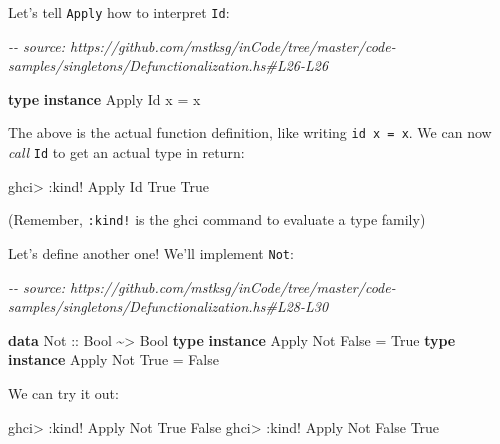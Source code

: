 \documentclass[]{article}
\newenvironment{Shaded}{}{}
\newcommand{\CommentTok}[1]{\textcolor[rgb]{0.38,0.63,0.69}{\textit{#1}}}
\newcommand{\DataTypeTok}[1]{\textcolor[rgb]{0.56,0.13,0.00}{#1}}
\newcommand{\KeywordTok}[1]{\textcolor[rgb]{0.00,0.44,0.13}{\textbf{#1}}}
\newcommand{\NormalTok}[1]{#1}
\newcommand{\OperatorTok}[1]{\textcolor[rgb]{0.40,0.40,0.40}{#1}}
\newcommand{\OtherTok}[1]{\textcolor[rgb]{0.00,0.44,0.13}{#1}}
\begin{document}
Let's tell \texttt{Apply} how to interpret \texttt{Id}:

\begin{Shaded}
\begin{Highlighting}[]
\CommentTok{{-}{-} source: https://github.com/mstksg/inCode/tree/master/code{-}samples/singletons/Defunctionalization.hs\#L26{-}L26}

\KeywordTok{type} \KeywordTok{instance} \DataTypeTok{Apply} \DataTypeTok{Id}\NormalTok{ x }\OtherTok{=}\NormalTok{ x}
\end{Highlighting}
\end{Shaded}

The above is the actual function definition, like writing \texttt{id\ x\ =\ x}.
We can now \emph{call} \texttt{Id} to get an actual type in return:

\begin{Shaded}
\begin{Highlighting}[]
\NormalTok{ghci}\OperatorTok{\textgreater{}} \OperatorTok{:}\NormalTok{kind}\OperatorTok{!} \DataTypeTok{Apply} \DataTypeTok{Id} \DataTypeTok{\textquotesingle{}True}
\DataTypeTok{\textquotesingle{}True}
\end{Highlighting}
\end{Shaded}

(Remember, \texttt{:kind!} is the ghci command to evaluate a type family)

Let's define another one! We'll implement \texttt{Not}:

\begin{Shaded}
\begin{Highlighting}[]
\CommentTok{{-}{-} source: https://github.com/mstksg/inCode/tree/master/code{-}samples/singletons/Defunctionalization.hs\#L28{-}L30}

\KeywordTok{data} \DataTypeTok{Not}\OtherTok{ ::} \DataTypeTok{Bool} \OperatorTok{\textasciitilde{}\textgreater{}} \DataTypeTok{Bool}
\KeywordTok{type} \KeywordTok{instance} \DataTypeTok{Apply} \DataTypeTok{Not} \DataTypeTok{\textquotesingle{}False} \OtherTok{=} \DataTypeTok{\textquotesingle{}True}
\KeywordTok{type} \KeywordTok{instance} \DataTypeTok{Apply} \DataTypeTok{Not} \DataTypeTok{\textquotesingle{}True}  \OtherTok{=} \DataTypeTok{\textquotesingle{}False}
\end{Highlighting}
\end{Shaded}

We can try it out:

\begin{Shaded}
\begin{Highlighting}[]
\NormalTok{ghci}\OperatorTok{\textgreater{}} \OperatorTok{:}\NormalTok{kind}\OperatorTok{!} \DataTypeTok{Apply} \DataTypeTok{Not} \DataTypeTok{\textquotesingle{}True}
\DataTypeTok{\textquotesingle{}False}
\NormalTok{ghci}\OperatorTok{\textgreater{}} \OperatorTok{:}\NormalTok{kind}\OperatorTok{!} \DataTypeTok{Apply} \DataTypeTok{Not} \DataTypeTok{\textquotesingle{}False}
\DataTypeTok{\textquotesingle{}True}
\end{Highlighting}
\end{Shaded}
\end{document}
